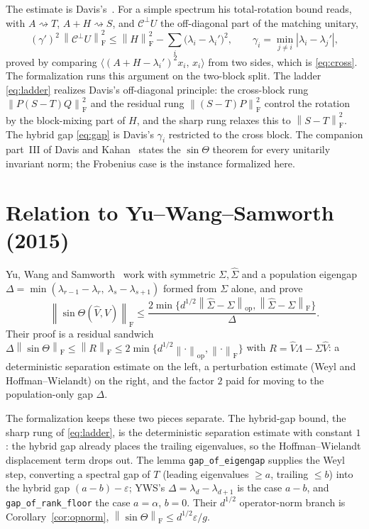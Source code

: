\documentclass[11pt]{article}
\newcommand{\norm}[1]{\left\lVert #1\right\rVert}
\newcommand{\eps}{\varepsilon}
\newcommand{\F}{\mathrm{F}}
\newcommand{\op}{\mathrm{op}}
\newcommand{\inner}[2]{\langle #1,\,#2\rangle}
\newcommand{\gap}{g}
\newcommand{\sinT}{\sin\Theta}
\theoremstyle{remark}
\begin{document}
The estimate is Davis's~\cite{Davis1963}.  For a simple spectrum his
total-rotation bound reads, with $A\rightsquigarrow T$, $A+H\rightsquigarrow S$,
and $\mathcal C^{\perp}U$ the off-diagonal part of the matching unitary,
\[
  (\gamma')^2\,\norm{\mathcal C^{\perp}U}_{\F}^2
  \le\norm{H}_{\F}^2-\sum_i\bigl(\lambda_i-\lambda_i'\bigr)^2,
  \qquad
  \gamma_i=\min_{j\ne i}|\lambda_i-\lambda_j'|,
\]
proved by comparing $\inner{(A+H-\lambda_i')^2x_i}{x_i}$ from two sides, which is
\eqref{eq:cross}.  The formalization runs this argument on the two-block split.
The ladder \eqref{eq:ladder} realizes Davis's off-diagonal principle: the
cross-block rung $\norm{P(S-T)Q}_{\F}^2$ and the residual rung
$\norm{(S-T)P}_{\F}^2$ control the rotation by the block-mixing part of $H$,
and the sharp rung relaxes this to $\norm{S-T}_{\F}^2$.  The hybrid gap
\eqref{eq:gap} is Davis's $\gamma_i$ restricted to the cross block.  The companion
part~III of Davis and Kahan~\cite{DavisKahan1970} states the $\sin\Theta$ theorem
for every unitarily invariant norm; the Frobenius case is the instance formalized
here.

\section{Relation to Yu--Wang--Samworth (2015)}

Yu, Wang and Samworth~\cite{YWS2015} work with symmetric $\Sigma,\widehat\Sigma$
and a population eigengap $\Delta=\min(\lambda_{r-1}-\lambda_r,\
\lambda_s-\lambda_{s+1})$ formed from $\Sigma$ alone, and prove
\[
  \norm{\sinT(\widehat V,V)}_{\F}
  \le\frac{2\min\{d^{1/2}\norm{\widehat\Sigma-\Sigma}_{\op},
                   \norm{\widehat\Sigma-\Sigma}_{\F}\}}{\Delta}.
\]
Their proof is a residual sandwich
$\Delta\norm{\sinT}_{\F}\le\norm{R}_{\F}\le
2\min\{d^{1/2}\norm{\cdot}_{\op},\norm{\cdot}_{\F}\}$ with
$R=\widehat V\Lambda-\Sigma\widehat V$: a deterministic separation estimate on the
left, a perturbation estimate (Weyl and Hoffman--Wielandt) on the right, and the
factor $2$ paid for moving to the population-only gap $\Delta$.

The formalization keeps these two pieces separate.  The hybrid-gap bound, the
sharp rung of \eqref{eq:ladder}, is the deterministic separation estimate with
constant $1$: the hybrid gap already places the trailing eigenvalues, so the
Hoffman--Wielandt displacement term drops out.  The lemma
\texttt{gap\_of\_eigengap} supplies the Weyl step, converting a spectral gap of
$T$ (leading eigenvalues $\ge a$, trailing $\le b$) into the hybrid gap
$(a-b)-\eps$; YWS's $\Delta=\lambda_d-\lambda_{d+1}$ is the case $a-b$, and
\texttt{gap\_of\_rank\_floor} the case $a=\alpha$, $b=0$.  Their $d^{1/2}$
operator-norm branch is Corollary~\ref{cor:opnorm},
$\norm{\sinT}_{\F}\le d^{1/2}\eps/\gap$.
\end{document}
